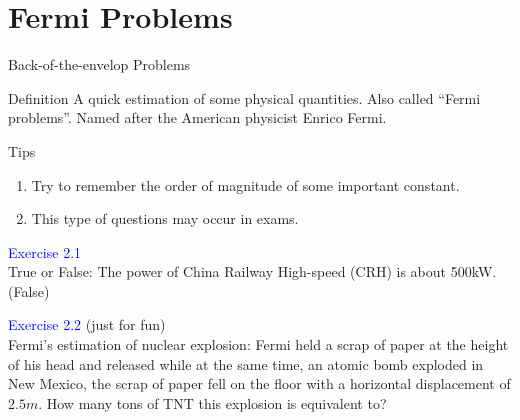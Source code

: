 \documentclass{beamer}
\begin{document}
\section{Fermi Problems}
\begin{frame}{Back-of-the-envelop Problems}
  \begin{block}{Definition}
    A quick estimation of some physical quantities. Also called ``Fermi problems''. Named after the American physicist Enrico Fermi.
  \end{block}
  \pause
  \begin{block}{Tips}
    \begin{enumerate}
      \item Try to remember the order of magnitude of some important constant.
      \item This type of questions may occur in exams.
    \end{enumerate}
  \end{block}
  \pause
  \textcolor{blue}{Exercise 2.1}\\
  True or False: The power of China Railway High-speed (CRH) is about 500kW.\\
  (False)\\
\end{frame}

\begin{frame}
  \textcolor{blue}{Exercise 2.2} (just for fun)\\
  Fermi's estimation of nuclear explosion: Fermi held a scrap of paper at the height of his head and released while at the same time, an atomic bomb exploded in New Mexico, the scrap of paper fell on the floor with a horizontal displacement of $2.5m$. How many tons of TNT this explosion is equivalent to?
\end{frame}
\end{document}
